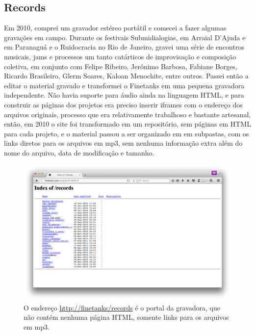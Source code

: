 \subsection{Records}
Em 2010, comprei um gravador estéreo portátil e comecei a fazer algumas gravações em campo. Durante os festivais Submidialogias, em Arraial D'Ajuda e em Paranaguá e o Ruidocracia no Rio de Janeiro, gravei uma série de encontros musicais, jams e processos um tanto catárticos de improvisação e composição coletiva, em conjunto com Felipe Ribeiro, Jerônimo Barbosa, Fabiane Borges, Ricardo Brasileiro, Glerm Soares, Kaloan Menochite, entre outros. Passei então a editar o material gravado e transformei o Finetanks em uma pequena gravadora independente. Não havia suporte para áudio ainda na linguagem HTML, e para construir as páginas dos projetos era preciso inserir iframes com o endereço dos arquivos originais, processo que era relativamente trabalhoso e bastante artesanal, então, em 2010 o site foi transformado em um repositório, sem páginas em HTML para cada projeto, e o material passou a ser organizado em em subpastas, com os links diretos para os arquivos em mp3, sem nenhuma informação extra além do nome do arquivo, data de modificação e tamanho. 


\begin{figure}
\centering
\includegraphics[width=1\textwidth]{pictures/cap1/finetanksrecords}
\caption{O endereço \url{http://finetanks/records} é o portal da gravadora, que não contém nenhuma página HTML, somente links para os arquivos em mp3.}
\label{fig:finetanksrecords}
\end{figure}


